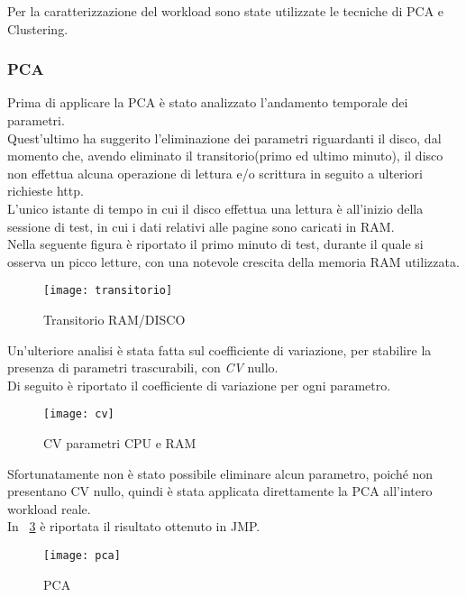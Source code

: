 Per la caratterizzazione del workload sono state utilizzate le tecniche di PCA e
Clustering.\\
\clearpage
\subsubsection{PCA}
Prima di applicare la PCA è stato analizzato l'andamento temporale dei parametri.\\
Quest'ultimo ha suggerito l'eliminazione dei parametri riguardanti il disco, dal
momento che, avendo eliminato il transitorio(primo ed ultimo minuto), il disco
non effettua alcuna operazione di lettura e/o scrittura in seguito a ulteriori
richieste http.\\
L'unico istante di tempo in cui il disco effettua una lettura è all'inizio
della sessione di test, in cui i dati relativi alle pagine sono caricati in RAM.\\
Nella seguente figura è riportato il primo minuto di test,
durante il quale si osserva un picco letture, con una notevole crescita della
memoria RAM utilizzata.\\

\begin{figure}[!htbp]
  \centering
  \texttt{[image: transitorio]}
  \caption{Transitorio RAM/DISCO}
  \label{webserver_transitorio}
\end{figure}

\clearpage

Un'ulteriore analisi è stata fatta sul coefficiente di variazione,
per stabilire la presenza di parametri trascurabili, con \textit{CV} nullo.\\
Di seguito è riportato il coefficiente di variazione per ogni parametro.\\

\begin{figure}[!htbp]
  \centering
  \texttt{[image: cv]}
  \caption{CV parametri CPU e RAM}
  \label{webserver_cv1}
\end{figure}
\clearpage
Sfortunatamente non è stato possibile eliminare alcun parametro, poiché non
presentano CV nullo, quindi è stata applicata direttamente la PCA all'intero
workload reale.\\
In \figurename~\ref{webserver_pca} è riportata il risultato ottenuto in JMP.\\

\begin{figure}[!htbp]
  \centering
  \texttt{[image: pca]}
  \caption{PCA}
  \label{webserver_pca}
\end{figure}


